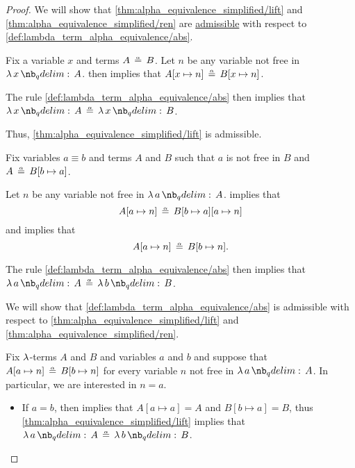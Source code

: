 \begin{proof}
  \SufficiencySubProof We will show that \ref{thm:alpha_equivalence_simplified/lift} and \ref{thm:alpha_equivalence_simplified/ren} are \hyperref[con:inference_rule_admissibility]{admissible} with respect to \ref{def:lambda_term_alpha_equivalence/abs}.

   Fix a variable \( x \) and terms \( A \aequiv B \). Let \( n \) be any variable not free in \( \qabs x A \).  then implies that \( A[x \mapsto n] \aequiv B[x \mapsto n] \).

  The rule \ref{def:lambda_term_alpha_equivalence/abs} then implies that \( \qabs x A \aequiv \qabs x B \).

  Thus, \ref{thm:alpha_equivalence_simplified/lift} is admissible.

   Fix variables \( a \equiv b \) and terms \( A \) and \( B \) such that \( a \) is not free in \( B \) and \( A \aequiv B[b \mapsto a] \).

  Let \( n \) be any variable not free in \( \qabs a A \).  implies that
  \begin{equation*}
    A[a \mapsto n] \aequiv B[b \mapsto a][a \mapsto n]
  \end{equation*}
  and  implies that
  \begin{equation*}
    A[a \mapsto n] \aequiv B[b \mapsto n].
  \end{equation*}

  The rule \ref{def:lambda_term_alpha_equivalence/abs} then implies that \( \qabs a A \aequiv \qabs b B \).

  \NecessitySubProof We will show that \ref{def:lambda_term_alpha_equivalence/abs} is admissible with respect to \ref{thm:alpha_equivalence_simplified/lift} and \ref{thm:alpha_equivalence_simplified/ren}.

  Fix \( \mathrm{\lambda} \)-terms \( A \) and \( B \) and variables \( a \) and \( b \) and suppose that \( A[a \mapsto n] \aequiv B[b \mapsto n] \) for every variable \( n \) not free in \( \qabs a A \). In particular, we are interested in \( n = a \).

  \begin{itemize}
    \item If \( a = b \), then  implies that \( A[a \mapsto a] = A \) and \( B[b \mapsto a] = B \), thus \ref{thm:alpha_equivalence_simplified/lift} implies that \( \qabs a A \aequiv \qabs b B \).


\end{itemize}
\end{proof}

